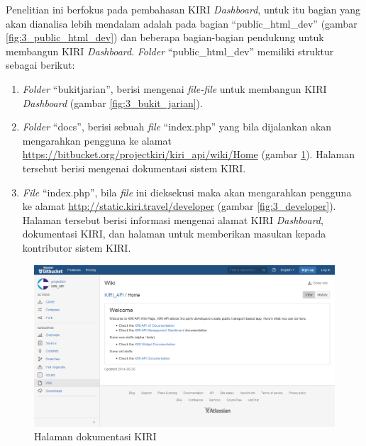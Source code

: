 \documentclass[a4paper,twoside]{article}
\begin{document}
\begin{enumerate}
Penelitian ini berfokus pada pembahasan KIRI \textit{Dashboard}, untuk itu bagian yang akan dianalisa lebih mendalam adalah pada bagian ``public\_html\_dev'' (gambar \ref{fig:3_public_html_dev}) dan beberapa bagian-bagian pendukung untuk membangun KIRI \textit{Dashboard}. \textit{Folder} ``public\_html\_dev'' memiliki struktur sebagai berikut:
\begin{enumerate}
	\item \textit{Folder} ``bukitjarian'', berisi mengenai \textit{file-file} untuk membangun KIRI \textit{Dashboard} (gambar \ref{fig:3_bukit_jarian}).
	\item \textit{Folder} ``docs'', berisi sebuah \textit{file} ``index.php'' yang bila dijalankan akan mengarahkan pengguna ke alamat \url{https://bitbucket.org/projectkiri/kiri_api/wiki/Home} (gambar \ref{fig:3_dokumentasi}). Halaman tersebut berisi mengenai dokumentasi sistem KIRI.
	\item \textit{File} ``index.php'', bila \textit{file} ini dieksekusi maka akan mengarahkan pengguna ke alamat \url{http://static.kiri.travel/developer} (gambar \ref{fig:3_developer}). Halaman tersebut berisi informasi mengenai alamat KIRI \textit{Dashboard}, dokumentasi KIRI, dan halaman untuk memberikan masukan kepada kontributor sistem KIRI.
\end{enumerate}

\begin{figure}[htbp]
	\centering
		\includegraphics[scale=0.35]{Gambar/3_dokumentasi.png}
	\caption{Halaman dokumentasi KIRI}
	\label{fig:3_dokumentasi}
\end{figure}


\end{enumerate}
\end{document}
